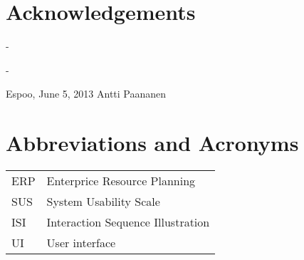 \documentclass[12pt,a4paper,oneside,pdftex]{report}
\newcommand{\DATE}{June 5, 2013}
\newcommand{\AUTHOR}{Antti Paananen}
\begin{document}




\chapter*{Acknowledgements}


-

-
\vskip 10mm

\noindent Espoo, \DATE
\vskip 5mm
\noindent\AUTHOR

\cleardoublepage
% 

\chapter*{Abbreviations and Acronyms}


\noindent
\begin{longtable}{@{}p{}p{}@{}}
ERP & Enterprice Resource Planning \\
SUS & System Usability Scale \\
ISI & Interaction Sequence Illustration \\
UI & User interface

\end{longtable}
\end{document}
